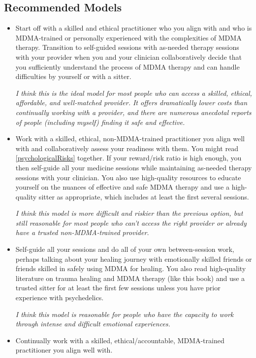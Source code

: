\documentclass[11pt,oneside]{book}
\begin{document}
\subsection*{Recommended Models}
\begin{itemize}
    \item Start off with a skilled and ethical practitioner who you align with and who is MDMA-trained or personally experienced with the complexities of MDMA therapy. Transition to self-guided sessions with as-needed therapy sessions with your provider when you and your clinician collaboratively decide that you sufficiently understand the process of MDMA therapy and can handle difficulties by yourself or with a sitter.
    
    \textit{I think this is the ideal model for most people who can access a skilled, ethical, affordable, and well-matched provider. It offers dramatically lower costs than continually working with a provider, and there are numerous anecdotal reports of people (including myself) finding it safe and effective.}
    \item Work with a skilled, ethical, non-MDMA-trained practitioner you align well with and collaboratively assess your readiness with them. You might read \cref{psychologicalRisks} together. If your reward/risk ratio is high enough, you then self-guide all your medicine sessions while maintaining as-needed therapy sessions with your clinician. You also use high-quality resources to educate yourself on the nuances of effective and safe MDMA therapy and use a high-quality sitter as appropriate, which includes at least the first several sessions.
    
    \textit{I think this model is more difficult and riskier than the previous option, but still reasonable for most people who can't access the right provider or already have a trusted non-MDMA-trained provider.}
    \item Self-guide all your sessions and do all of your own between-session work, perhaps talking about your healing journey with emotionally skilled friends or friends skilled in safely using MDMA for healing. You also read high-quality literature on trauma healing and MDMA therapy (like this book) and use a trusted sitter for at least the first few sessions unless you have prior experience with psychedelics.
    
    \textit{I think this model is reasonable for people who have the capacity to work through intense and difficult emotional experiences.}
    \item Continually work with a skilled, ethical/accountable, MDMA-trained practitioner you align well with.
    

\end{itemize}
\end{document}
